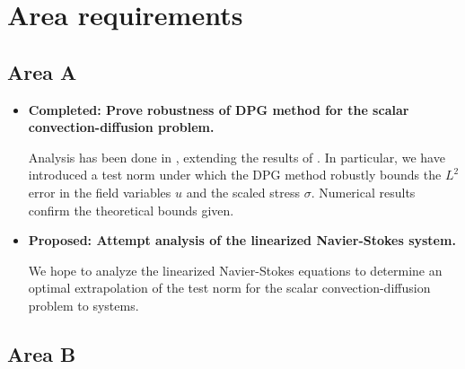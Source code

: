 \section{Area requirements}

\subsection{Area A}

\begin{itemize}
\item{\textbf{Completed: Prove robustness of DPG method for the scalar convection-diffusion problem.}}

Analysis has been done in \cite{DPGrobustness2}, extending the results of \cite{DPGrobustness}. In particular, we have introduced a test norm under which the DPG method robustly bounds the $L^2$ error in the field variables $u$ and the scaled stress $\sigma$. Numerical results confirm the theoretical bounds given. 

\item{\textbf{Proposed: Attempt analysis of the linearized Navier-Stokes system.}}

We hope to analyze the linearized Navier-Stokes equations to determine an optimal extrapolation of the test norm for the scalar convection-diffusion problem to systems. 

\end{itemize}

\subsection{Area B}

